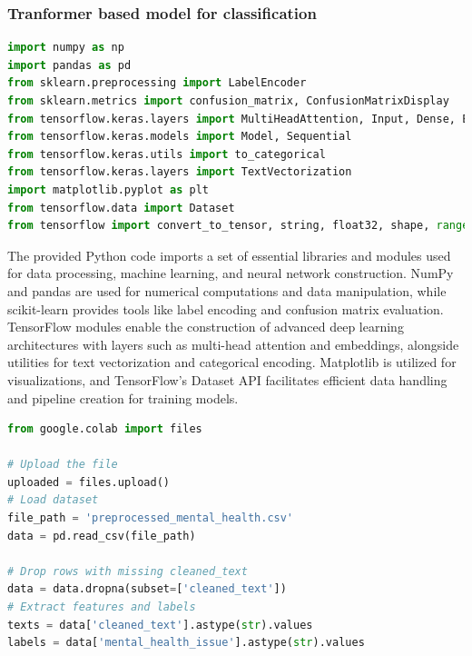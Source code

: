 \subsubsection{Tranformer based model for classification}

\begin{tcolorbox}[colback=gray!5!white, colframe=gray!80!black, boxrule=0.5pt, title=Importing Libraries]
    \begin{lstlisting}[language=Python]
import numpy as np
import pandas as pd
from sklearn.preprocessing import LabelEncoder
from sklearn.metrics import confusion_matrix, ConfusionMatrixDisplay
from tensorflow.keras.layers import MultiHeadAttention, Input, Dense, Embedding, GlobalAveragePooling1D, LayerNormalization, Layer
from tensorflow.keras.models import Model, Sequential
from tensorflow.keras.utils import to_categorical
from tensorflow.keras.layers import TextVectorization
import matplotlib.pyplot as plt
from tensorflow.data import Dataset
from tensorflow import convert_to_tensor, string, float32, shape, range, reshape
    \end{lstlisting}
\end{tcolorbox}

\noindent
The provided Python code imports a set of essential libraries and modules used for data processing, machine learning, and neural network construction. NumPy and pandas are used for numerical computations and data manipulation, while scikit-learn provides tools like label encoding and confusion matrix evaluation. TensorFlow modules enable the construction of advanced deep learning architectures with layers such as multi-head attention and embeddings, alongside utilities for text vectorization and categorical encoding. Matplotlib is utilized for visualizations, and TensorFlow's Dataset API facilitates efficient data handling and pipeline creation for training models.

\begin{tcolorbox}[colback=gray!5!white, colframe=gray!80!black, boxrule=0.5pt, title=Load Dataset]
    \begin{lstlisting}[language=Python]
from google.colab import files

# Upload the file
uploaded = files.upload()
# Load dataset
file_path = 'preprocessed_mental_health.csv'
data = pd.read_csv(file_path)

# Drop rows with missing cleaned_text
data = data.dropna(subset=['cleaned_text'])
# Extract features and labels
texts = data['cleaned_text'].astype(str).values
labels = data['mental_health_issue'].astype(str).values
    \end{lstlisting}
\end{tcolorbox}

